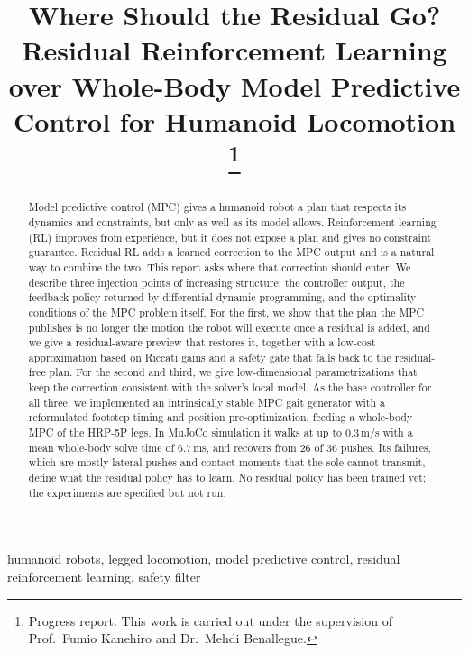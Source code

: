 \documentclass[conference]{IEEEtran}
\begin{document}
\title{Where Should the Residual Go? Residual Reinforcement Learning over Whole-Body Model Predictive Control for Humanoid Locomotion%
\thanks{Progress report. This work is carried out under the supervision of Prof.~Fumio Kanehiro and Dr.~Mehdi Benallegue.}}

\author{
}

\maketitle

\begin{abstract}
Model predictive control (MPC) gives a humanoid robot a plan that respects its dynamics and constraints, but only as well as its model allows.
Reinforcement learning (RL) improves from experience, but it does not expose a plan and gives no constraint guarantee.
Residual RL adds a learned correction to the MPC output and is a natural way to combine the two.
This report asks where that correction should enter.
We describe three injection points of increasing structure: the controller output, the feedback policy returned by differential dynamic programming, and the optimality conditions of the MPC problem itself.
For the first, we show that the plan the MPC publishes is no longer the motion the robot will execute once a residual is added, and we give a residual-aware preview that restores it, together with a low-cost approximation based on Riccati gains and a safety gate that falls back to the residual-free plan.
For the second and third, we give low-dimensional parametrizations that keep the correction consistent with the solver's local model.
As the base controller for all three, we implemented an intrinsically stable MPC gait generator with a reformulated footstep timing and position pre-optimization, feeding a whole-body MPC of the HRP-5P legs.
In MuJoCo simulation it walks at up to 0.3\,m/s with a mean whole-body solve time of 6.7\,ms, and recovers from 26 of 36 pushes.
Its failures, which are mostly lateral pushes and contact moments that the sole cannot transmit, define what the residual policy has to learn.
No residual policy has been trained yet; the experiments are specified but not run.
\end{abstract}

\begin{IEEEkeywords}
humanoid robots, legged locomotion, model predictive control, residual reinforcement learning, safety filter
\end{IEEEkeywords}
\end{document}
